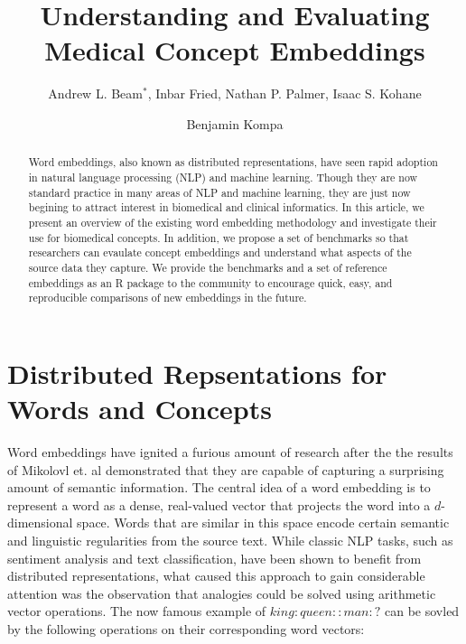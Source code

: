 \documentclass{ws-procs11x85}
\begin{document}
\title{Understanding and Evaluating Medical Concept Embeddings}

\author{Andrew L. Beam$^*$, Inbar Fried, Nathan P. Palmer, Isaac S. Kohane}

\address{Department of Biomedical Informatics, Harvard Medical School,\\
Boston, MA, 02115, USA\\
$^*$E-mail: Andrew\_Beam@hms.harvard.edu\\
www.university\_name.edu}

\author{Benjamin Kompa}

\address{University of North Carolina, Chapel Hill,\\
Chapel Hill, NC, 27514, USA\\
E-mail: kompa@live.unc.edu}

\begin{abstract}
Word embeddings, also known as distributed representations, have seen rapid adoption in natural language processing (NLP) and machine learning. Though they are now standard practice in many areas of NLP and machine learning, they are just now begining to attract interest in biomedical and clinical informatics. In this article, we present an overview of the existing word embedding methodology and investigate their use for biomedical concepts. In addition, we propose a set of benchmarks so that researchers can evaulate concept embeddings and understand what aspects of the source data they capture. We provide the benchmarks and a set of reference embeddings as an R package to the community to encourage quick, easy, and reproducible comparisons of new embeddings in the future.
\end{abstract}


\bodymatter


\section{Distributed Repsentations for Words and Concepts}\label{aba:intro}
Word embeddings have ignited a furious amount of research after the the results of Mikolovl\cite{mikolov2013distributed} et. al demonstrated that they are capable of capturing a surprising amount of semantic information. The central idea of a word embedding is to represent a word as a dense, real-valued vector that projects the word into a $d$-dimensional space. Words that are similar in this space encode certain semantic and linguistic regularities from the source text. While classic NLP tasks, such as sentiment analysis and text classification, have been shown to benefit from distributed representations, what caused this approach to gain considerable attention was the observation that analogies could be solved using arithmetic vector operations. The now famous example of $king:queen::man:?$ can be sovled by the following operations on their corresponding word vectors: 
\end{document}

